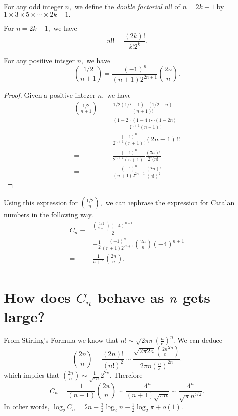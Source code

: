 
\begin{definition}
	For any odd integer $n,$ we define the \emph{double factorial}
	$n!!$ of $n=2k-1$ by $1 \times 3 \times  5 \times \cdots 
	\times 2k-1.$
\end{definition}
For $n = 2k-1,$ we have
$$ n!! = \frac{(2k)!}{k! 2^k}.$$


\begin{lemma}
	For any positive integer $n,$ we have
	$$ \binom{1/2}{n+1} = 
	\frac{(-1)^n}{ (n+1) 2^{2n+1}} \binom{2n}{n}.$$
\end{lemma}

\begin{proof}
	Given a positive integer $n,$ we have
	\begin{align*}
		\binom{1/2}{n+1}
		={}& \frac{1/2 (1/2-1)\cdots(1/2-n)}{(n+1)!}\\
		={}& \frac{(1-2)(1-4)\cdots(1-2n)}{2^{n+1} (n+1)!} \\
		={}& \frac{(-1)^n}{2^{n+1} (n+1)!} (2n-1)!!\\
		={}& \frac{(-1)^n}{2^{n+1} (n+1)!} \frac{(2n)!}{2^n (n!}\\
		={}& \frac{(-1)^n}{(n+1) 2^{2n+1}} \frac{(2n)!}{(n!)^2}
	\end{align*}
	
\end{proof}


Using this expression for $\binom{1/2}{n},$ we can rephrase the 
expression for Catalan numbers in the following way.
\begin{align*}
	C_n ={}& \frac{\binom{1/2}{n+1} (-4)^{n+1}}{2} \\
	={}& - \frac{1}{2} \frac{(-1)^n}{(n+1) 2^{2n+1}} \binom{2n}{n}
	(-4)^{n+1} \\
	={}& \frac{1}{n+1} \binom{2n}{n} .\\
\end{align*}

\section{How does $C_n$ behave as $n$ gets large?}
From Stirling's Formula we know that
$n! \sim \sqrt{2 \pi n} \left( \frac{n}{e} \right) ^n.$ We can deduce
$$ \binom{2n }{n} = 
\frac{(2n)!}{(n!)^2} \sim
\frac{\sqrt{2\pi 2n} \left( \frac{2n}{e}^{2n} \right) }{ 2\pi n (
\frac{n}{e})^{2n}}.$$
which implies that
$\binom{2n}{n} \sim \frac{1}{\sqrt{\pi n}} 2^{2n}.$
Therefore
$$ C_n = \frac{1}{(n+1)} \binom{2n}{n}
\sim \frac{4^n}{(n+1) \sqrt{\pi n}}
\sim \frac{4^n}{ \sqrt{\pi} n^{3/2}}.$$
In other words,
$\log_2 C_n = 2n - \frac{3}{2} \log_2 n - \frac{1}{2} \log_2 \pi + o(1).$

